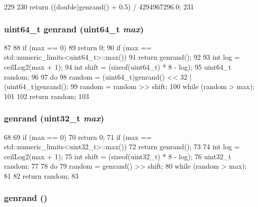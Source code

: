 \begin{DoxyCode}
229     {
230         return ((double)genrand() + 0.5) / 4294967296.0;
231     }
\end{DoxyCode}
\hypertarget{classRandom_a82359e4b7fa67ab2d2ef1518765e1cf1}{
\subsubsection[{genrand}]{\setlength{\rightskip}{0pt plus 5cm}uint64\_\-t genrand (uint64\_\-t {\em max})}}
\label{classRandom_a82359e4b7fa67ab2d2ef1518765e1cf1}



\begin{DoxyCode}
87 {
88     if (max == 0)
89         return 0;
90     if (max == std::numeric_limits<uint64_t>::max())
91         return genrand();
92 
93     int log = ceilLog2(max + 1);
94     int shift = (sizeof(uint64_t) * 8 - log);
95     uint64_t random;
96 
97     do {
98         random = (uint64_t)genrand() << 32 | (uint64_t)genrand();
99         random = random >> shift;
100     } while (random > max);
101 
102     return random;
103 }
\end{DoxyCode}
\hypertarget{classRandom_a5693787c75a3629488eeaf62371e4131}{
\subsubsection[{genrand}]{ genrand ({\bf uint32\_\-t} {\em max})}}
\label{classRandom_a5693787c75a3629488eeaf62371e4131}



\begin{DoxyCode}
68 {
69     if (max == 0)
70         return 0;
71     if (max == std::numeric_limits<uint32_t>::max())
72         return genrand();
73 
74     int log = ceilLog2(max + 1);
75     int shift = (sizeof(uint32_t) * 8 - log);
76     uint32_t random;
77 
78     do {
79         random = genrand() >> shift;
80     } while (random > max);
81 
82     return random;
83 }
\end{DoxyCode}
\hypertarget{classRandom_a01e55bb9c07b5c043b6092d0a4e1d297}{
\subsubsection[{genrand}]{ genrand ()}}
\label{classRandom_a01e55bb9c07b5c043b6092d0a4e1d297}




